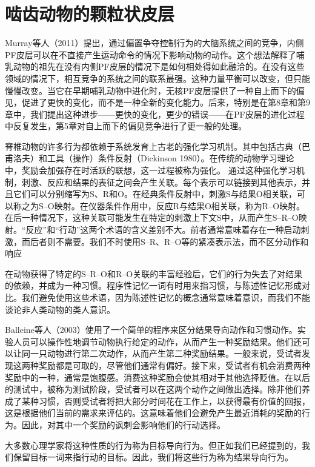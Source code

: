 \section{啮齿动物的颗粒状皮层}
Murray等人（2011）提出，通过偏置争夺控制行为的大脑系统之间的竞争，内侧PF皮层可以在不直接产生运动命令的情况下影响动物的动作。这个想法解释了哺乳动物的祖先在没有内侧PF皮层的情况下是如何相处得如此融洽的。在没有这些领域的情况下，相互竞争的系统之间的联系最强。这种力量平衡可以改变，但只能慢慢改变。当它在早期哺乳动物中进化时，无核PF皮层提供了一种自上而下的偏见，促进了更快的变化，而不是一种全新的变化能力。后来，特别是在第8章和第9章中，我们提出这种进步——更快的变化，更少的错误——在PF皮层的进化过程中反复发生，第5章对自上而下的偏见竞争进行了更一般的处理。\par
脊椎动物的许多行为都依赖于系统发育上古老的强化学习机制。其中包括古典（巴甫洛夫）和工具（操作）条件反射（Dickinson 1980）。在传统的动物学习理论中，奖励会加强存在时活跃的联想，这一过程被称为强化。
通过这种强化学习机制，刺激、反应和结果的表征之间会产生关联。每个表示可以链接到其他表示，并且它们可以分别缩写为S、R和O。在经典条件反射中，刺激S与结果O相关联，可以称之为S–O映射。在仪器条件作用中，反应R与结果O相关联，称为R–O映射。在后一种情况下，这种关联可能发生在特定的刺激上下文S中，从而产生S–R–O映射。“反应”和“行动”这两个术语的含义差别不大。前者通常意味着存在一种启动刺激，而后者则不需要。我们不时使用S–R、R–O等的紧凑表示法，而不区分动作和响应\par
在动物获得了特定的S–R–O和R–O关联的丰富经验后，它们的行为失去了对结果的依赖，并成为一种习惯。程序性记忆一词有时用来指习惯，与陈述性记忆形成对比。我们避免使用这些术语，因为陈述性记忆的概念通常意味着意识，而我们不能谈论非人类动物的类人意识。\par
Balleine等人（2003）使用了一个简单的程序来区分结果导向动作和习惯动作。实验人员可以操作性地调节动物执行给定的动作，从而产生一种奖励结果。他们还可以让同一只动物进行第二次动作，从而产生第二种奖励结果。一般来说，受试者发现这两种奖励都是可取的，尽管他们通常有偏好。接下来，受试者有机会消费两种奖励中的一种，通常是饱腹感。消费这种奖励会使其相对于其他选择贬值。在以后的测试中，被称为测试阶段，受试者可以在这两个动作之间做出选择。除非他们养成了某种习惯，否则受试者将把大部分时间花在工作上，以获得最有价值的回报，这是根据他们当前的需求来评估的。这意味着他们会避免产生最近消耗的奖励的行为。因此，对其中一个奖励的讽刺会影响他们的行动选择。\par
大多数心理学家将这种性质的行为称为目标导向行为。但正如我们已经提到的，我们保留目标一词来指行动的目标。因此，我们将这些行为称为结果导向行为。\par
